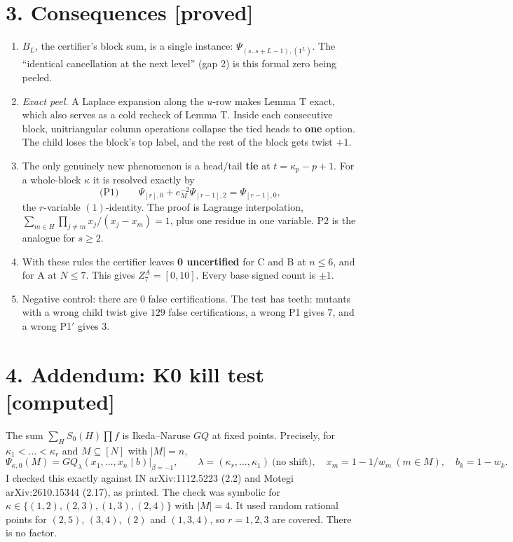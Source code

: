 \documentclass[10pt]{article}
\begin{document}
\section*{3. Consequences [proved]}
\begin{enumerate}
\item $B_L$, the certifier's block sum, is a single instance: $\Psi_{(s..s+L-1),(1^L)}$. The ``identical cancellation at the next level'' (gap 2) is this
formal zero being peeled.
\item \emph{Exact peel.} A Laplace expansion along the $u$-row makes Lemma T exact, which also serves as a cold recheck of Lemma T. Inside each consecutive
block, unitriangular column operations collapse the tied heads to \textbf{one} option. The child loses the block's top label, and the rest of the
block gets twist $+1$.
\item The only genuinely new phenomenon is a head/tail \textbf{tie} at $t=\kappa_p-p+1$. For a whole-block $\kappa$ it is resolved exactly by
\[
\text{(P1)}\qquad \Psi_{[r],0}+e_M^{-2}\Psi_{[r-1],2}=\Psi_{[r-1],0},
\]
the $r$-variable $(1)$-identity. The proof is Lagrange interpolation, $\sum_{m\in H}\prod_{j\ne m}x_j/(x_j-x_m)=1$, plus one residue in one variable.
P2 is the analogue for $s\ge2$.
\item With these rules the certifier leaves \textbf{0 uncertified} for C and B at $n\le6$, and for A at $N\le7$. This gives $Z^A_7=[0,10]$.
Every base signed count is $\pm1$.
\item Negative control: there are $0$ false certifications. The test has teeth: mutants with a wrong child twist give $129$ false certifications,
a wrong P1 gives $7$, and a wrong P1$'$ gives $3$.
\end{enumerate}

\section*{4. Addendum: K0 kill test [computed]}
The sum $\sum_H S_0(H)\prod f$ is Ikeda--Naruse $GQ$ at fixed points. Precisely, for $\kappa_1<\dots<\kappa_r$ and $M\subseteq[N]$ with $|M|=n$,
\[
\Psi_{\kappa,0}(M)=GQ_\lambda(x_1,\dots,x_n\mid b)\big|_{\beta=-1},\qquad
\lambda=(\kappa_r,\dots,\kappa_1)\ \text{(no shift)},\quad x_m=1-1/w_m\ (m\in M),\quad b_k=1-w_k .
\]
I checked this exactly against IN arXiv:1112.5223 (2.2) and Motegi arXiv:2610.15344 (2.17), as printed. The check was symbolic for
$\kappa\in\{(1,2),(2,3),(1,3),(2,4)\}$ with $|M|=4$. It used random rational points for $(2,5)$, $(3,4)$, $(2)$ and $(1,3,4)$, so $r=1,2,3$ are covered.
There is no factor.
\end{document}
